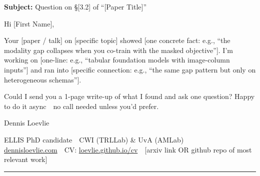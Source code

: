 \documentclass[11pt,letterpaper]{article}
\newcommand{\bdash}{\,\textemdash\,}
\begin{document}

\textbf{Subject:} Question on \S[3.2] of ``[Paper Title]''

\vspace{1em}

Hi [First Name],

\vspace{0.3em}

Your [paper / talk] on [specific topic] showed [one concrete fact: e.g.,
``the modality gap collapses when you co-train with the masked
objective'']. I'm working on [one-line: e.g., ``tabular foundation
models with image-column inputs''] and ran into [specific connection:
e.g., ``the same gap pattern but only on heterogeneous schemas''].

\vspace{0.3em}

Could I send you a 1-page write-up of what I found and ask one
question? Happy to do it async \bdash{} no call needed unless you'd prefer.

\vspace{0.3em}

Dennis Loevlie

\vspace{0.5em}

{\sffamily\footnotesize\color{meta}%
ELLIS PhD candidate \bdash{} CWI (TRLLab) \& UvA (AMLab) \bdash{} \\
\href{https://dennisloevlie.com}{dennisloevlie.com} \bdash{}
CV: \href{https://loevlie.github.io/cv/loevlie-cv-latest.pdf}{loevlie.github.io/cv} \bdash{}
[arxiv link OR github repo of most relevant work]
}

\vspace{2em}
{\color{rule}\rule{\linewidth}{0.4pt}}
\vspace{1em}
\end{document}
